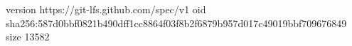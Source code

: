 version https://git-lfs.github.com/spec/v1
oid sha256:587d0bbf0821b490dff1cc8864f03f8b2f6879b957d017c49019bbf709676849
size 13582
